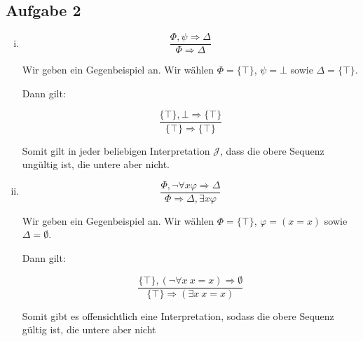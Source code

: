 \documentclass[a4paper,10pt]{article}
\begin{document}
\subsection*{Aufgabe 2}
\begin{enumerate}[(i)]
\item
$$\frac{\Phi, \psi \Rightarrow \Delta}{\Phi \Rightarrow \Delta}$$

Wir geben ein Gegenbeispiel an. Wir wählen $\Phi = \{\top\}$, $\psi = \bot$ sowie $\Delta = \{\top\}$. 

Dann gilt:

$$\frac{\{\top\}, \bot \Rightarrow \{\top\}}{\{\top\} \Rightarrow \{\top\}}$$

Somit gilt in jeder beliebigen Interpretation $\mathcal{J}$, dass die obere Sequenz ungültig ist, die untere aber nicht.
\item
$$\frac{\Phi, \lnot\forall x\varphi \Rightarrow \Delta}{\Phi \Rightarrow \Delta, \exists x \varphi}$$

Wir geben ein Gegenbeispiel an. Wir wählen $\Phi = \{\top\}$, $\varphi = (x=x)$ sowie $\Delta = \emptyset$. 

Dann gilt:

$$\frac{\{\top\}, (\lnot \forall x ~ x = x) \Rightarrow \emptyset}{\{\top\} \Rightarrow (\exists x~ x=x)}$$

Somit gibt es offensichtlich eine Interpretation, sodass die obere Sequenz gültig ist, die untere aber nicht


\end{enumerate}
	
\end{document}
